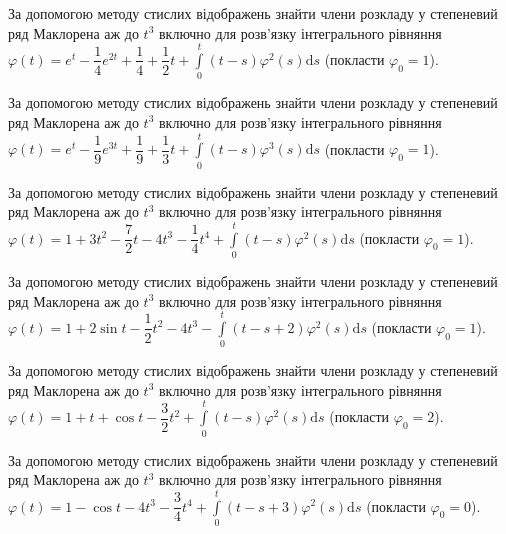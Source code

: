 \documentclass[12pt]{extarticle}
\begin{document}
\begin{Exercise}
За допомогою методу стислих відображень знайти члени розкладу у степеневий ряд Маклорена аж до $t^3$ включно для розв’язку інтегрального рівняння $\varphi (t) = e^t - \dfrac{1}{4} e^{2t} + \dfrac{1}{4} + \dfrac{1}{2} t + \int\limits_{0}^{t} (t-s) \varphi^2(s) \mathrm{d}s$ (покласти $\varphi_0 = 1$).
\end{Exercise}

\begin{Exercise}
За допомогою методу стислих відображень знайти члени розкладу у степеневий ряд Маклорена аж до $t^3$ включно для розв’язку інтегрального рівняння $\varphi (t) = e^t - \dfrac{1}{9} e^{3t} + \dfrac{1}{9} + \dfrac{1}{3} t + \int\limits_{0}^{t} (t-s) \varphi^3(s) \mathrm{d}s$ (покласти $\varphi_0 = 1$).
\end{Exercise}

\begin{Exercise}
За допомогою методу стислих відображень знайти члени розкладу у степеневий ряд Маклорена аж до $t^3$ включно для розв’язку інтегрального рівняння $\varphi (t) = 1 + 3t^2 - \dfrac{7}{2} t - 4 t^3 - \dfrac{1}{4} t^4 + \int\limits_{0}^{t} (t - s)\varphi^2(s) \mathrm{d}s$ (покласти $\varphi_0 = 1$).
\end{Exercise}

\begin{Exercise}
За допомогою методу стислих відображень знайти члени розкладу у степеневий ряд Маклорена аж до $t^3$ включно для розв’язку інтегрального рівняння $\varphi (t) = 1 + 2 \sin t - \dfrac{1}{2} t^2 - 4 t^3 - \int\limits_{0}^{t} (t - s + 2)\varphi^2(s) \mathrm{d}s$ (покласти $\varphi_0 = 1$).
\end{Exercise}

\begin{Exercise}
За допомогою методу стислих відображень знайти члени розкладу у степеневий ряд Маклорена аж до $t^3$ включно для розв’язку інтегрального рівняння $\varphi (t) = 1 + t + \cos t - \dfrac{3}{2} t^2 + \int\limits_{0}^{t} (t - s)\varphi^2(s) \mathrm{d}s$ (покласти $\varphi_0 = 2$).
\end{Exercise}

\begin{Exercise}
За допомогою методу стислих відображень знайти члени розкладу у степеневий ряд Маклорена аж до $t^3$ включно для розв’язку інтегрального рівняння $\varphi (t) = 1 - \cos t - 4 t^3 - \dfrac{3}{4} t^4 + \int\limits_{0}^{t} (t - s + 3)\varphi^2(s) \mathrm{d}s$ (покласти $\varphi_0 = 0$).
\end{Exercise}
\end{document}

